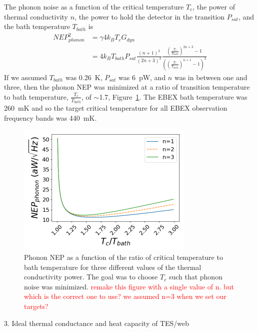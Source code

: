 The phonon noise as a function of the critical temperature $T_{c}$, the power of thermal conductivity $n$,  the power to hold the detector in the transition $P_{sat}$, and the bath temperature $T_{bath}$ is
\begin{equation}
\label{eq:phonon_nep}
\begin{split}
NEP_{phonon}^2 & = \gamma4k_{B}T_{c}G_{dyn} \\
& = 4k_{B}T_{bath}P_{sat}\frac{(n+1)^{2}}{(2n+3)^2}\frac{\left(\frac{T_{c}}{T_{bath}}\right)^{2n+3}-1}{\left( \left(\frac{T_{c}}{T_{bath}}\right)^{n+1}-1\right)^{2}}
\end{split}
\end{equation}
If we assumed $T_{bath}$ was 0.26~K, $P_{sat}$ was 6~pW, and $n$ was in between one and three, then the phonon \ac{NEP} was minimized at a ratio of transition temperature to bath temperature, $\frac{T_{c}}{T_{bath}}$, of $\sim$1.7, Figure~\ref{fig:phonon_nep_vs_temps}. 
The \ac{EBEX} bath temperature was 260~mK and so the target critical temperature for all \ac{EBEX} observation frequency bands was 440~mK.

\begin{figure}[htp]
\begin{center}
\includegraphics[height=2.5in]{figures/phonon_nep_vs_temperature.png}
\caption{Phonon \ac{NEP} as a function of the ratio of critical temperature to bath temperature for three different values of the thermal conductivity power. The goal was to choose $T_{c}$ such that phonon noise was minimized. \textcolor{red}{remake this figure with a single value of n. but which is the correct one to use? we assumed n=3 when we set our targets?}
\label{fig:phonon_nep_vs_temps} }
\end{center}
\end{figure}

3. Ideal thermal conductance and heat capacity of TES/web 

